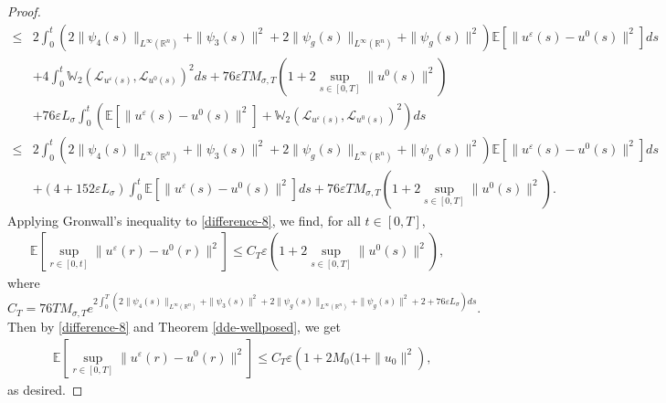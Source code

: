 \documentclass[11pt]{article}
\numberwithin{equation}{section}
\theoremstyle{plain}
\def\leq{\leqslant}
\begin{document}
\begin{proof}
\begin{align}
        \leq & 2 \int_0^t
        \left( 2 \| \psi_4(s) \|_{L^\infty(\mathbb{R}^n)}
        + \| \psi_3(s) \|^2
        + 2 \|\psi_g(s)\|_{L^\infty(\mathbb{R}^n)}
        + \| \psi_g(s) \|^2
        \right)
        \mathbb{E}
        \left[ \| u^\varepsilon(s) - u^0(s) \|^2
        \right]
        ds  \nonumber \\
        & + 4 \int_0^t
        \mathbb{W}_2
        \left(
        \mathcal{L}_{u^\varepsilon(s)},
        \mathcal{L}_{u^0(s)}
        \right)^2
        ds
        + 76 \varepsilon T M_{\sigma,T}
        \left( 1 + 2 \sup_{s \in [0,T]} \| u^0(s) \|^2
        \right)
        \nonumber \\
        & + 76 \varepsilon L_{\sigma}
        \int_0^t
        \left(
        \mathbb{E} \left[ \| u^\varepsilon (s) - u^0 (s) \|^2 \right]
        + \mathbb{W}_2 \left( \mathcal{L}_{u^\varepsilon (s)}, \mathcal{L}_{u^0(s)}
        \right)^2
        \right)
        ds  \nonumber \\
        \leq & 2 \int_0^t
        \left( 2 \| \psi_4(s) \|_{L^\infty(\mathbb{R}^n)}
        + \| \psi_3(s) \|^2
        + 2 \|\psi_g(s)\|_{L^\infty(\mathbb{R}^n)}
        + \| \psi_g(s) \|^2
        \right)
        \mathbb{E}
        \left[ \| u^\varepsilon(s) - u^0(s) \|^2
        \right]
        ds  \nonumber \\
        & + \left( 4 + 152 \varepsilon L_{\sigma} \right)
        \int_0^t
        \mathbb{E}
        \left[\| u^\varepsilon(s) - u^0(s) \|^2
        \right]
        ds
        + 76 \varepsilon T M_{\sigma,T}
        \left( 1 + 2 \sup_{s \in [0,T]} \| u^0(s) \|^2
        \right).
    \end{align}
    Applying Gronwall's inequality to \eqref{difference-8}, we find,
    for all $t\in [0,T]$,
    \begin{align} \label{difference-9}
        \mathbb{E}
        \left[ \sup_{r \in [0,t]}
        \| u^\varepsilon(r) - u^0 (r) \|^2
        \right]
        \leq  C_T \varepsilon
        \left( 1 + 2 \sup_{s \in [0,T]} \| u^0(s) \|^2
        \right),
    \end{align}
    where
    $C_T = 76 T M_{\sigma,T}
    e^{ 2 \int_0^T
        \left( 2 \| \psi_4(s) \|_{L^\infty(\mathbb{R}^n)}
        + \| \psi_3(s) \|^2
        + 2 \|\psi_g(s)\|_{L^\infty(\mathbb{R}^n)}
        + \| \psi_g(s) \|^2
        + 2
        + 76 \varepsilon L_{\sigma}
        \right)
        ds}.
    $
    Then by \eqref{difference-8} and Theorem \ref{dde-wellposed}, we
    get
    \begin{align*}
        & \mathbb{E}
        \left[ \sup_{r \in [0,T]}
        \| u^\varepsilon(r) - u^0 (r) \|^2
        \right]
        \leq  C_T \varepsilon
        \left( 1 + 2 M_0( 1 + \| u_0 \|^2
        \right),
    \end{align*}
    as desired.
 \end{proof}
\end{document}
